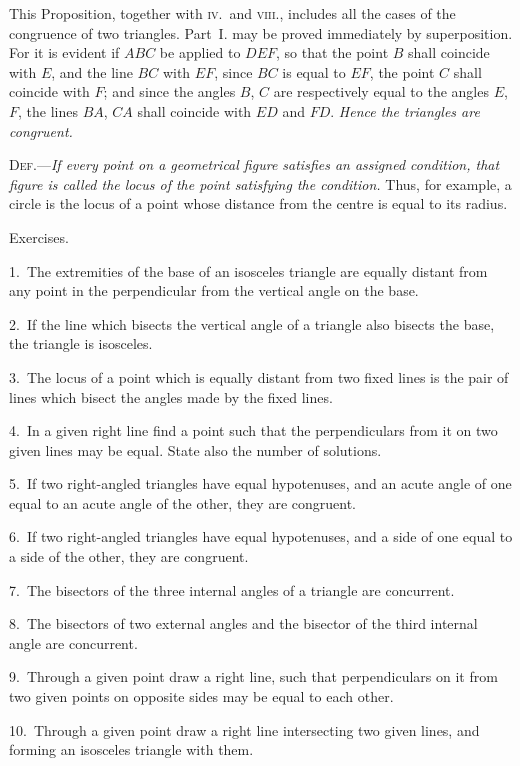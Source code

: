 \documentclass[oneside]{book}
\newcommand\exhead[1]{
\Needspace*{5\baselineskip}\begin{center}
\textsf{#1}
\end{center}
}
\begin{document}
\begin{footnotesize}
This Proposition, together with \textsc{iv.}\ and \textsc{viii}., includes all the
cases of the congruence of two triangles. Part~I. may be proved
immediately by superposition. For it is evident if $ABC$ be applied
to $DEF$, so that the point $B$ shall coincide with $E$, and the line
$BC$ with $EF$, since $BC$ is equal to $EF$, the point $C$ shall coincide
with $F$; and since the angles $B$, $C$ are respectively equal to the
angles $E$, $F$, the lines $BA$, $CA$ shall coincide with $ED$ and $FD$.
\emph{Hence the triangles are congruent.}
\par\end{footnotesize}\bigskip



\textsc{Def.}---\textit{If every point on a geometrical figure satisfies an
assigned condition, that figure is called the locus of the
point satisfying the condition.} Thus, for example, a
circle is the locus of a point whose distance from the
centre is equal to its radius.


\exhead{Exercises.}

\begin{footnotesize}
1.~The extremities of the base of an isosceles triangle are equally
distant from any point in the perpendicular from the vertical angle
on the base.

2.~If the line which bisects the vertical angle of a triangle also
bisects the base, the triangle is isosceles.

3.~The locus of a point which is equally distant from two fixed
lines is the pair of lines which bisect the angles made by the
fixed lines.

4.~In a given right line find a point such that the perpendiculars
from it on two given lines may be equal. State also the number
of solutions.

5.~If two right-angled triangles have equal hypotenuses, and
an acute angle of one equal to an acute angle of the other, they
are congruent.

6.~If two right-angled triangles have equal hypotenuses, and
a side of one equal to a side of the other, they are congruent.

7.~The bisectors of the three internal angles of a triangle are
concurrent.

8.~The bisectors of two external angles and the bisector of the
third internal angle are concurrent.

9.~Through a given point draw a right line, such that perpendiculars
on it from two given points on opposite sides may be
equal to each other.

10.~Through a given point draw a right line intersecting two
given lines, and forming an isosceles triangle with them.
\par\end{footnotesize}
\end{document}
